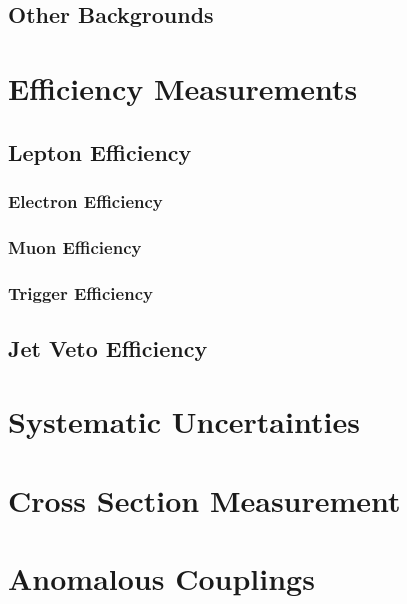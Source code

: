 \documentclass{cmspaper}
\begin{document}
  \subsection{Other Backgrounds}
    \label{sec:bkg_other}
    

\section{Efficiency Measurements}
    \label{sec:alleff}
    \subsection{Lepton Efficiency}
    \label{sec:efficiency}
    
        \subsubsection{Electron Efficiency}
        
        \label{sec:eff_electron}
        \subsubsection{Muon Efficiency}
        
        \label{sec:eff_muon}
        \subsubsection{Trigger Efficiency}
        
        \label{sec:eff_trigger}
    \subsection{Jet Veto Efficiency}
    

\section{Systematic Uncertainties}
  \label{sec:systematics}
  

  \clearpage

\section{Cross Section Measurement}
  \label{sec:xsec}
  

\section{Anomalous Couplings}
  \label{sec:atgc}
  
\end{document}
